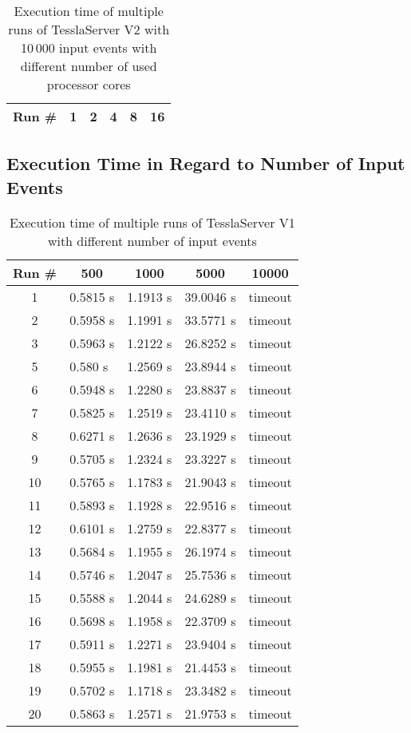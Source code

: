 \begin{table}[!htb]
  \centering
  \caption{Execution time of multiple runs of TesslaServer V2 with 10\,000 input events with different number of used processor cores}
  \label{table:tessla_server_v2_num_cores_data}
  \begin{tabular}{clllll}
    Run \# & \multicolumn{1}{c}{1} & \multicolumn{1}{c}{2} & \multicolumn{1}{c}{4} & \multicolumn{1}{c}{8} & \multicolumn{1}{c}{16} \\ \hline
  \end{tabular}
\end{table}

\clearpage

\subsection{Execution Time in Regard to Number of Input Events}
\label{sec:appendix:runtime_benchmark_data:execution_time_cores}

\begin{table}[!htb]
  \centering
  \caption{Execution time of multiple runs of TesslaServer V1 with different number of input events}
  \label{table:tessla_server_v1_events_num_events_data}
  \begin{tabular}{cllll}
    Run \# & \multicolumn{1}{c}{500} & \multicolumn{1}{c}{1000} & \multicolumn{1}{c}{5000}  & \multicolumn{1}{c}{10000} \\ \hline
    1 &  0.5815 s & 1.1913 s & 39.0046 s & timeout\\
    2 &  0.5958 s & 1.1991 s & 33.5771 s & timeout\\
    3 &  0.5963 s & 1.2122 s & 26.8252 s & timeout\\
    5 &  0.580 s  & 1.2569 s & 23.8944 s & timeout\\
    6 &  0.5948 s & 1.2280 s & 23.8837 s & timeout\\
    7 &  0.5825 s & 1.2519 s & 23.4110 s & timeout\\
    8 &  0.6271 s & 1.2636 s & 23.1929 s & timeout\\
    9 &  0.5705 s & 1.2324 s & 23.3227 s & timeout\\
    10 & 0.5765 s & 1.1783 s & 21.9043 s & timeout\\
    11 & 0.5893 s & 1.1928 s & 22.9516 s & timeout\\
    12 & 0.6101 s & 1.2759 s & 22.8377 s & timeout\\
    13 & 0.5684 s & 1.1955 s & 26.1974 s & timeout\\
    14 & 0.5746 s & 1.2047 s & 25.7536 s & timeout\\
    15 & 0.5588 s & 1.2044 s & 24.6289 s & timeout\\
    16 & 0.5698 s & 1.1958 s & 22.3709 s & timeout\\
    17 & 0.5911 s & 1.2271 s & 23.9404 s & timeout\\
    18 & 0.5955 s & 1.1981 s & 21.4453 s & timeout\\
    19 & 0.5702 s & 1.1718 s & 23.3482 s & timeout\\
    20 & 0.5863 s & 1.2571 s & 21.9753 s & timeout
  \end{tabular}
\end{table}

